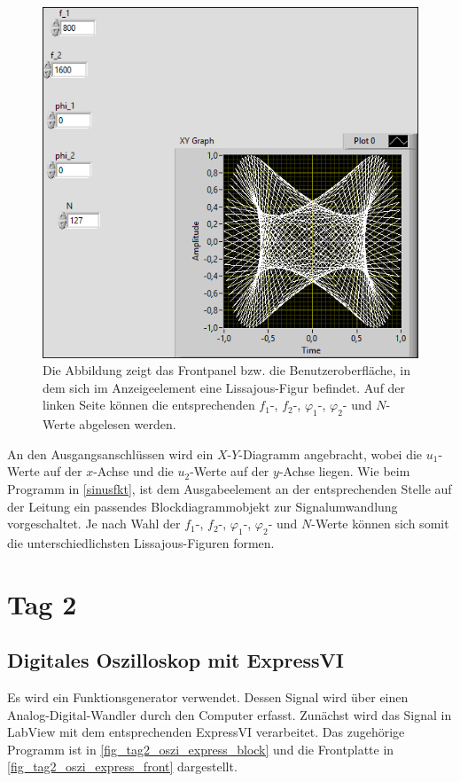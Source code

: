 \documentclass[
a4paper,
12pt,
pagesize,
ngerman
]{scrartcl}
\begin{document}
	\begin{figure}[H]
		\centering
		\includegraphics[width=1.0\textwidth]{EIRE2018Dateien/Tag1/lissajous-bilder/Lissajousp}
		\caption{Die Abbildung zeigt das Frontpanel bzw. die Benutzeroberfläche, in dem sich im Anzeigeelement eine Lissajous-Figur befindet. Auf der linken Seite können die entsprechenden $f_1$-, $f_2$-, $\varphi_1$-, $\varphi_2$- und $N$-Werte abgelesen werden.}
		\label{lissajous}
	\end{figure}

	\noindent An den Ausgangsanschlüssen wird ein $X$-$Y$-Diagramm angebracht, wobei die $u_1$-Werte auf der $x$-Achse und die $u_2$-Werte auf der $y$-Achse liegen. Wie beim Programm in \cref{sinusfkt}, ist dem Ausgabeelement an der entsprechenden Stelle auf der Leitung ein passendes Blockdiagrammobjekt zur Signalumwandlung vorgeschaltet. Je nach Wahl der $f_1$-, $f_2$-, $\varphi_1$-, $\varphi_2$- und $N$-Werte können sich somit die unterschiedlichsten Lissajous-Figuren formen.
	
	\section{Tag 2}
	
	\subsection{Digitales Oszilloskop mit ExpressVI}
	Es wird ein Funktionsgenerator verwendet.
	Dessen Signal wird über einen Analog-Digital-Wandler durch den Computer erfasst.
	Zunächst wird das Signal in LabView mit dem entsprechenden ExpressVI verarbeitet.
	Das zugehörige Programm ist in \cref{fig_tag2_oszi_express_block} und die Frontplatte in \cref{fig_tag2_oszi_express_front} dargestellt.
	
\end{document}

